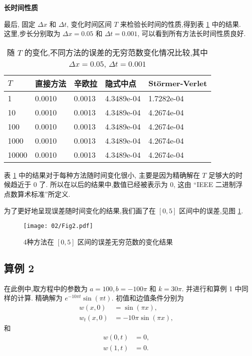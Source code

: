 \textbf{长时间性质}

最后, 固定 $\Delta x$ 和 $\Delta t$, 变化时间区间 $T$ 来检验长时间的性质,得到表 \ref{tab:t1} 中的结果. 这里,步长分别取为 $\Delta x = 0.05$ 和 $\Delta t = 0.001$, 可以看到所有方法长时间性质良好.

\begin{table}[h]
  \centering
\caption{随 $T$ 的变化,不同方法的误差的无穷范数变化情况比较,其中 $\Delta x=0.05$, $\Delta t=0.001$}
\begin{tabularx}{\linewidth}{XXXXX}
 \toprule[1.5pt]
 $T$ &直接方法 & 辛欧拉 & 隐式中点 & St\"{o}rmer-Verlet\\
 \midrule[1pt]
 1 & 0.0010 & 0.0013 & 4.3489e-04 & 1.7282e-04 \\
 10 & 0.0010 & 0.0013 & 4.3489e-04 & 4.2674e-04 \\
 100 & 0.0010 & 0.0013 & 4.3489e-04 & 4.2674e-04 \\
 1000 & 0.0010 & 0.0013 & 4.3489e-04 & 4.2674e-04 \\
 10000 & 0.0010 & 0.0013 & 4.3489e-04 & 4.2674e-04 \\
 \bottomrule[1.5pt]
\end{tabularx}
  \label{tab:t1}
\end{table}

表 \ref{tab:t1} 中的结果对于每种方法随时间变化很小, 主要是因为精确解在 $T$ 足够大的时候趋近于 $0$ 了. 所以在以后的结果中,数值已经被表示为 $0$, 这由 ``IEEE 二进制浮点数算术标准''所定义.

为了更好地呈现误差随时间变化的结果,我们画了在 $[0,5]$ 区间中的误差,见图 \ref{fig:err1}.

\begin{figure}[h]
    \centering
    \texttt{[image: 02/Fig2.pdf]}
    \caption{4种方法在 $[0,5]$ 区间的误差无穷范数的变化结果}
    \label{fig:err1}
\end{figure}


\subsection*{算例 2}
在此例中,取方程中的参数为 $a = 100, b
=-100\pi$ 和 $k =30\pi$. 并进行和算例 1 中同样的计算.
精确解为 $e^{-10\pi t}\sin(\pi t)$. 初值和边值条件分别为
\begin{equation*}
\begin{aligned}
w(x,0)&=\sin(\pi x),\\
w_t(x,0)&=-10 \pi \sin(\pi x),
\end{aligned}
\end{equation*}
和
\begin{equation*}
\begin{aligned}
w(0,t)&=0,\\
w(1,t)&=0.
\end{aligned}
\end{equation*}

